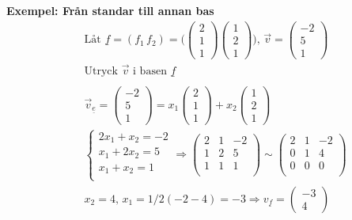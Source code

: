 \textbf{Exempel: Från standar till annan bas}
\begin{align*}
  &\quad  \text{Låt } \underline{f}=(f_1 \, f_2) =
  \Big( \begin{pmatrix} 2 \\ 1 \\ 1 \end{pmatrix} \begin{pmatrix} 1 \\ 2 \\ 1 \end{pmatrix} \Big), \,
  \vec{v} = \begin{pmatrix} -2 \\ 5 \\ 1 \end{pmatrix} \\
  &\quad  \text{Utryck $\vec{v}$ i basen $\underline{f}$} \\
  &\quad  \\
  &\quad  \vec{v}_{\underline{e}} = \begin{pmatrix} -2 \\ 5 \\ 1 \end{pmatrix} =
  x_1 \begin{pmatrix} 2 \\ 1 \\ 1 \end{pmatrix}  + x_2 \begin{pmatrix} 1 \\ 2 \\ 1 \end{pmatrix} \\
  &\quad \left\{\begin{array}{rr}
  2x_1 + x_2 = -2 \\
  x_1 + 2x_2 = 5  \\
  x_1 + x_2 = 1   \\
  \end{array}\right. \Rightarrow{}
  \left(\begin{array}{cc|c}
    2 & 1 & -2   \\
    1 & 2 &  5  \\
    1 & 1 &  1  \\
  \end{array}\right) \sim{}
  \left(\begin{array}{cc|c}
    2 & 1 & -2   \\
    0 & 1 &  4  \\
    0 & 0 &  0  \\
  \end{array}\right)  \\
  &\quad  x_2 = 4, \, x_1 = 1/2(-2 -4) = -3 \Rightarrow{} 
  v_{\underline{f}} = \begin{pmatrix} -3 \\ 4 \end{pmatrix} \\
\end{align*}

